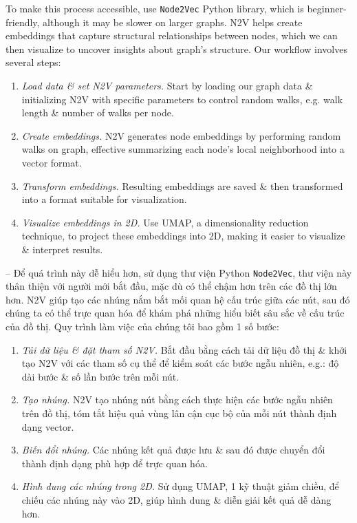\documentclass{article}
\begin{document}
\begin{itemize}
\begin{itemize}
        To make this process accessible, use {\tt Node2Vec} Python library, which is beginner-friendly, although it may be slower on larger graphs. N2V helps create embeddings that capture structural relationships between nodes, which we can then visualize to uncover insights about graph's structure. Our workflow involves several steps:
        \begin{enumerate}
            \item {\it Load data \& set N2V parameters.} Start by loading our graph data \& initializing N2V with specific parameters to control random walks, e.g. walk length \& number of walks per node.
            \item {\it Create embeddings.} N2V generates node embeddings by performing random walks on graph, effective summarizing each node's local neighborhood into a vector format.
            \item {\it Transform embeddings.} Resulting embeddings are saved \& then transformed into a format suitable for visualization.
            \item {\it Visualize embeddings in 2D.} Use UMAP, a dimensionality reduction technique, to project these embeddings into 2D, making it easier to visualize \& interpret results.
        \end{enumerate}
        -- Để quá trình này dễ hiểu hơn, sử dụng thư viện Python {\tt Node2Vec}, thư viện này thân thiện với người mới bắt đầu, mặc dù có thể chậm hơn trên các đồ thị lớn hơn. N2V giúp tạo các nhúng nắm bắt mối quan hệ cấu trúc giữa các nút, sau đó chúng ta có thể trực quan hóa để khám phá những hiểu biết sâu sắc về cấu trúc của đồ thị. Quy trình làm việc của chúng tôi bao gồm 1 số bước:
        \begin{enumerate}
            \item {\it Tải dữ liệu \& đặt tham số N2V.} Bắt đầu bằng cách tải dữ liệu đồ thị \& khởi tạo N2V với các tham số cụ thể để kiểm soát các bước ngẫu nhiên, e.g.: độ dài bước \& số lần bước trên mỗi nút.
            \item {\it Tạo nhúng.} N2V tạo nhúng nút bằng cách thực hiện các bước ngẫu nhiên trên đồ thị, tóm tắt hiệu quả vùng lân cận cục bộ của mỗi nút thành định dạng vector.
            \item {\it Biến đổi nhúng.} Các nhúng kết quả được lưu \& sau đó được chuyển đổi thành định dạng phù hợp để trực quan hóa.
            \item {\it Hình dung các nhúng trong 2D.} Sử dụng UMAP, 1 kỹ thuật giảm chiều, để chiếu các nhúng này vào 2D, giúp hình dung \& diễn giải kết quả dễ dàng hơn.

\end{enumerate}
\end{itemize}
\end{itemize}
\end{document}
